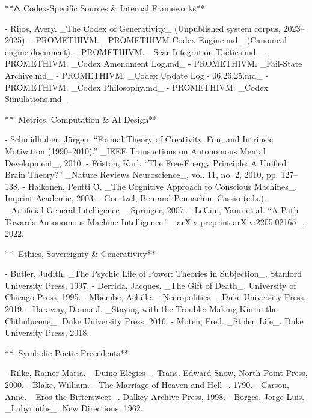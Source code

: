 **🜂 Codex-Specific Sources & Internal Frameworks**

- Rijos, Avery. _The Codex of Generativity_ (Unpublished system corpus, 2023–2025).
- PROMETHIVM. _PROMETHIVM Codex Engine.md_ (Canonical engine document).
- PROMETHIVM. _Scar Integration Tactics.md_
- PROMETHIVM. _Codex Amendment Log.md_
- PROMETHIVM. _Fail-State Archive.md_
- PROMETHIVM. _Codex Update Log - 06.26.25.md_
- PROMETHIVM. _Codex Philosophy.md_
- PROMETHIVM. _Codex Simulations.md_

**📐 Metrics, Computation & AI Design**

- Schmidhuber, Jürgen. “Formal Theory of Creativity, Fun, and Intrinsic Motivation (1990–2010).” _IEEE Transactions on Autonomous Mental Development_, 2010.
- Friston, Karl. “The Free-Energy Principle: A Unified Brain Theory?” _Nature Reviews Neuroscience_, vol. 11, no. 2, 2010, pp. 127–138.
- Haikonen, Pentti O. _The Cognitive Approach to Conscious Machines_. Imprint Academic, 2003.
- Goertzel, Ben and Pennachin, Cassio (eds.). _Artificial General Intelligence_. Springer, 2007.
- LeCun, Yann et al. “A Path Towards Autonomous Machine Intelligence.” _arXiv preprint arXiv:2205.02165_, 2022.

**🧬 Ethics, Sovereignty & Generativity**

- Butler, Judith. _The Psychic Life of Power: Theories in Subjection_. Stanford University Press, 1997.
- Derrida, Jacques. _The Gift of Death_. University of Chicago Press, 1995.
- Mbembe, Achille. _Necropolitics_. Duke University Press, 2019.
- Haraway, Donna J. _Staying with the Trouble: Making Kin in the Chthulucene_. Duke University Press, 2016.
- Moten, Fred. _Stolen Life_. Duke University Press, 2018.

**🔮 Symbolic-Poetic Precedents**

- Rilke, Rainer Maria. _Duino Elegies_. Trans. Edward Snow, North Point Press, 2000.
- Blake, William. _The Marriage of Heaven and Hell_. 1790.
- Carson, Anne. _Eros the Bittersweet_. Dalkey Archive Press, 1998.
- Borges, Jorge Luis. _Labyrinths_. New Directions, 1962.
